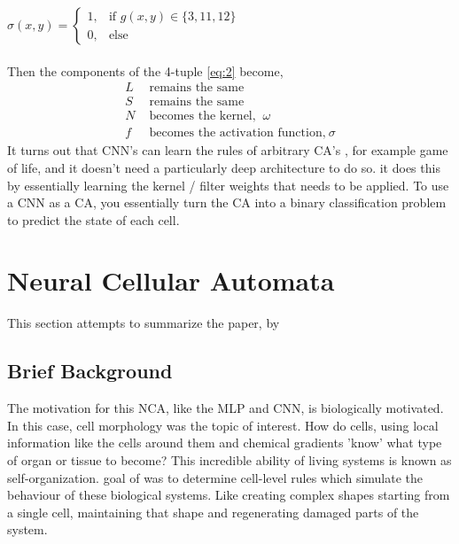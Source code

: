 $
\sigma(x, y) = \begin{cases}
	1, & \text{if } g(x, y) \in \{3, 11, 12\} \\
	0, & \text{else}
\end{cases}
$
\\ \\

Then the components of the 4-tuple \ref{eq:2} become,
\begin{align*}
	L &  \text{ remains the same } \\
	S &  \text{ remains the same} \\
	N &  \text{ becomes the kernel, } \ \omega \\
	f &  \text{ becomes the activation function,} \ \sigma
\end{align*} 
It turns out that CNN's can learn the rules of arbitrary CA's \cite{PhysRevE.100.032402}, for example game of life, and it doesn't need a particularly deep architecture to do so. it does this by essentially learning the kernel / filter weights that needs to be applied. To use a CNN as a CA, you essentially turn the CA into a binary classification problem to predict the state of each cell.

\section{Neural Cellular Automata}

This section attempts to summarize the paper,  by \citeauthor{growing_nca} \cite{growing_nca}
\subsection{Brief Background}

The motivation for this NCA, like the MLP and CNN, is biologically motivated. In this case, cell morphology was the topic of interest. How do cells, using local information like the cells around them and chemical gradients 'know' what type of organ or tissue to become? This incredible ability of living systems is known as self-organization. goal of \citeauthor{growing_nca} was to determine cell-level rules which simulate the behaviour of these biological systems. Like creating complex shapes  starting from a single cell, maintaining that shape and regenerating damaged parts of the system.


